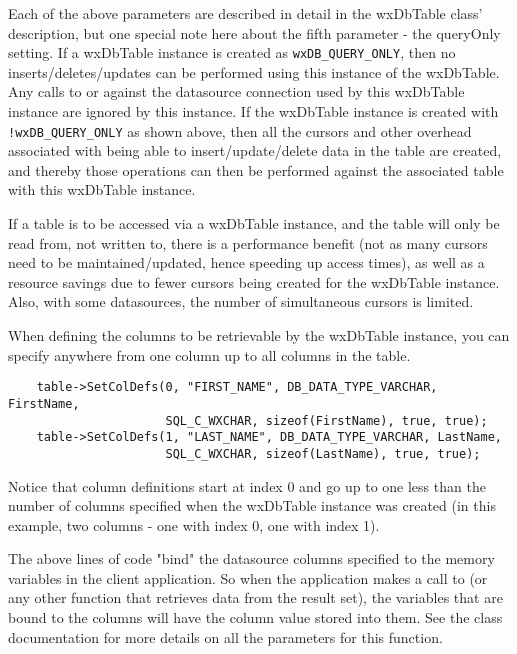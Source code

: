 Each of the above parameters are described in detail in the wxDbTable 
class' description, but one special note here about the fifth 
parameter - the queryOnly setting. If a wxDbTable instance is created as 
{\tt wxDB\_QUERY\_ONLY}, then no inserts/deletes/updates can be performed 
using this instance of the wxDbTable. Any calls to  
or  against the datasource 
connection used by this wxDbTable instance are ignored by this instance. If 
the wxDbTable instance is created with {\tt !wxDB\_QUERY\_ONLY} as shown above, 
then all the cursors and other overhead associated with being able to 
insert/update/delete data in the table are created, and thereby those 
operations can then be performed against the associated table with this 
wxDbTable instance.

If a table is to be accessed via a wxDbTable instance, and the table will 
only be read from, not written to, there is a performance benefit (not as 
many cursors need to be maintained/updated, hence speeding up access times), 
as well as a resource savings due to fewer cursors being created for the 
wxDbTable instance. Also, with some datasources, the number of 
simultaneous cursors is limited. 

When defining the columns to be retrievable by the wxDbTable instance, you 
can specify anywhere from one column up to all columns in the table. 

\begin{verbatim}
    table->SetColDefs(0, "FIRST_NAME", DB_DATA_TYPE_VARCHAR, FirstName,
                      SQL_C_WXCHAR, sizeof(FirstName), true, true);
    table->SetColDefs(1, "LAST_NAME", DB_DATA_TYPE_VARCHAR, LastName,
                      SQL_C_WXCHAR, sizeof(LastName), true, true);
\end{verbatim}

Notice that column definitions start at index 0 and go up to one less than 
the number of columns specified when the wxDbTable instance was created 
(in this example, two columns - one with index 0, one with index 1).

The above lines of code "bind" the datasource columns specified to the 
memory variables in the client application. So when the application 
makes a call to  (or any other function that retrieves 
data from the result set), the variables that are bound to the columns will 
have the column value stored into them. See the 
class documentation for more details on all the parameters for this function.

